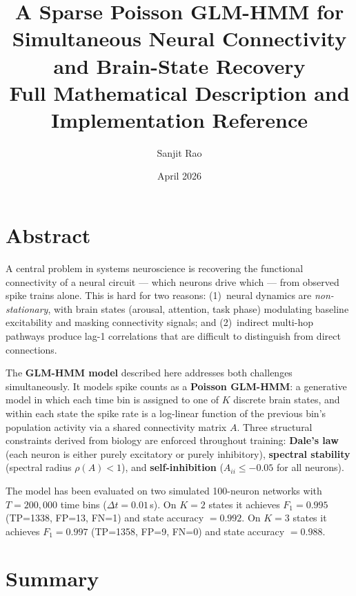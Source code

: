 \documentclass[11pt]{article}
\title{A Sparse Poisson GLM-HMM for Simultaneous Neural Connectivity\\and Brain-State Recovery\\[0.5em]
\normalsize Full Mathematical Description and Implementation Reference}
\author{Sanjit Rao}
\date{April 2026}
\begin{document}
\maketitle

\section*{Abstract}

A central problem in systems neuroscience is recovering the functional connectivity
of a neural circuit --- which neurons drive which --- from observed spike trains alone.
This is hard for two reasons: (1)~neural dynamics are \emph{non-stationary},
with brain states (arousal, attention, task phase) modulating baseline excitability
and masking connectivity signals; and (2)~indirect multi-hop pathways produce
lag-1 correlations that are difficult to distinguish from direct connections.

The \textbf{GLM-HMM model} described here addresses both challenges simultaneously.
It models spike counts as a \textbf{Poisson GLM-HMM}: a generative model in which
each time bin is assigned to one of $K$ discrete brain states, and within each state
the spike rate is a log-linear function of the previous bin's population activity via
a shared connectivity matrix $A$.  Three structural constraints derived from biology
are enforced throughout training: \textbf{Dale's law} (each neuron is either
purely excitatory or purely inhibitory), \textbf{spectral stability}
(spectral radius $\rho(A) < 1$), and \textbf{self-inhibition}
($A_{ii} \le -0.05$ for all neurons).

The model has been evaluated on two simulated 100-neuron networks with $T=200{,}000$
time bins ($\Delta t = 0.01$\,s).  On $K=2$ states it achieves $F_1 = 0.995$
(TP=1338, FP=13, FN=1) and state accuracy $= 0.992$.  On $K=3$ states it achieves
$F_1 = 0.997$ (TP=1358, FP=9, FN=0) and state accuracy $= 0.988$.

\section*{Summary}
\end{document}

